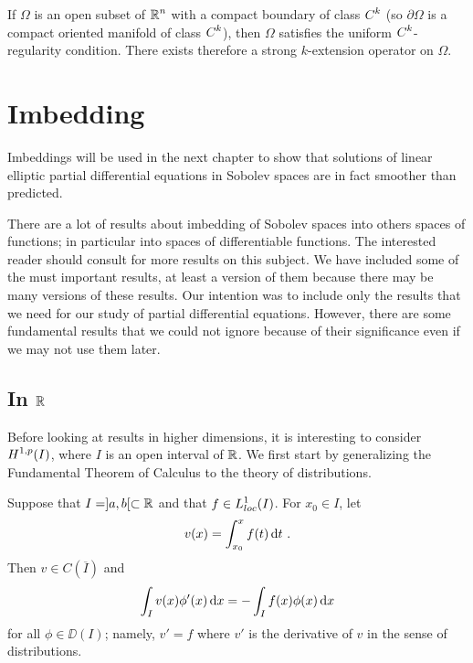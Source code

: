 
If $\Omega$ is an open subset of $\displaystyle \mathbb{R}^n$ with a compact
boundary of class $\displaystyle C^k$ (so $\partial \Omega$ is a
compact oriented manifold of class $\displaystyle C^k$),  then
$\Omega$ satisfies the uniform $\displaystyle C^k$-regularity 
condition.  There exists therefore a strong $k$-extension operator on
$\Omega$.

\section{Imbedding}

Imbeddings will be used in the next chapter to show that solutions of
linear elliptic partial differential equations in Sobolev spaces
are in fact smoother than predicted.

There are a lot of results about imbedding of Sobolev spaces into
others spaces of functions; in particular into spaces of
differentiable functions.  The interested reader should consult
\cite{Ad} for more results on this subject.  We have included some of
the must important results, at least a version of them because there
may be many versions of these results.  Our intention was to include
only the results that we need for our study of partial differential
equations.  However, there are some fundamental results that we could
not ignore because of their significance even if we may not use them
later.

\subsection{In $\mathbf{\mathbb{R}}$}

Before looking at results in higher dimensions, it is interesting to
consider $\displaystyle H^{1,p}(I)$, where $I$ is an open interval
of $\mathbb{R}$.  We first start by generalizing the
Fundamental Theorem of Calculus to the theory of distributions.

\begin{lemma} \label{sob_ftc}
Suppose that $I = ]a,b[ \subset \mathbb{R}$ and that
$\displaystyle f \in L^1_{loc}(I)$.  For $x_0 \in I$, let
\[
v(x) = \int_{x_0}^x f(t) \dx{t} \ .
\]
Then $v \in C(\overline{I})$ and
\[
\int_I v(x) \phi'(x) \,\mathrm{d}{x} = - \int _I f(x) \phi(x) \,\mathrm{d}{x}
\]
for all $\phi \in \DD(I)$; namely, $v' = f$ where $v'$ is the
derivative of $v$ in the sense of distributions.
\end{lemma}

